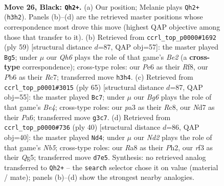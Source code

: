 \documentclass[11pt]{article}
\begin{document}
\clearpage

\begin{figure}[p]\centering
\begin{subfigure}{0.46\textwidth}\centering
\resizebox{\linewidth}{!}{%
\newchessgame
\chessboard[
  setfen={r6r/3nk2p/1pp1p1p1/8/1p1P3P/P3PRbq/RP4N1/2BQ2K1 b - - 4 26},
  showmover=false,
  pgfstyle=straightmove, color=movearrow, markmove={h3-h2}
]}
\caption{}
\end{subfigure}\hfill
\begin{subfigure}{0.46\textwidth}\centering
\resizebox{\linewidth}{!}{%
\newchessgame
\chessboard[
  setfen={5rk1/2r1b1p1/1p1Np2p/p1n1P2q/8/PP3PB1/4Q2P/2R2R1K b - - 5 30},
  showmover=false,
  pgfstyle=straightmove, color=movearrow, markmove={e7-g5}
]}
\caption{}
\end{subfigure}
\\[4pt]
\begin{subfigure}{0.46\textwidth}\centering
\resizebox{\linewidth}{!}{%
\newchessgame
\chessboard[
  setfen={2r3k1/7p/pn4p1/4bq2/1P1pNP2/1P4QP/P1p3P1/2B1R1K1 b - - 0 33},
  showmover=false,
  pgfstyle=straightmove, color=movearrow, markmove={e5-c7}
]}
\caption{}
\end{subfigure}\hfill
\begin{subfigure}{0.46\textwidth}\centering
\resizebox{\linewidth}{!}{%
\newchessgame
\chessboard[
  setfen={3r2k1/pp4qp/2n1prp1/1N1p2Q1/4P3/1P6/P4PPP/3R1RK1 w - - 0 21},
  showmover=false,
  pgfstyle=straightmove, color=movearrow, markmove={b5-d4}
]}
\caption{}
\end{subfigure}
\caption{\textbf{Move 26, Black: \texttt{Qh2+}.} (a) Our position; Melanie plays \texttt{Qh2+} (\texttt{h3h2}). Panels (b)--(d) are the retrieved master positions whose correspondence most drove this move (highest QAP objective among those that transfer to it). (b) Retrieved from \texttt{ccrl\_top\_p0000\#1692} (ply 59) [structural distance $d$=87, QAP obj=57]: the master played \texttt{Bg5}; under $\mu$ our \emph{Qh6} plays the role of that game's \emph{Be2} (a \textbf{cross-type} correspondence); cross-type roles: our \emph{P}e6 as their \emph{R}f8, our \emph{P}b6 as their \emph{R}c7; transferred move \texttt{h3h4}. (c) Retrieved from \texttt{ccrl\_top\_p0001\#3015} (ply 65) [structural distance $d$=87, QAP obj=55]: the master played \texttt{Bc7}; under $\mu$ our \emph{Bg6} plays the role of that game's \emph{Be4}; cross-type roles: our \emph{p}a3 as their \emph{R}c8, our \emph{N}d7 as their \emph{P}a6; transferred move \texttt{g3c7}. (d) Retrieved from \texttt{ccrl\_top\_p0000\#736} (ply 40) [structural distance $d$=86, QAP obj=40]: the master played \texttt{Nd4}; under $\mu$ our \emph{Nd2} plays the role of that game's \emph{Nb5}; cross-type roles: our \emph{R}a8 as their \emph{P}h2, our \emph{r}f3 as their \emph{Q}g5; transferred move \texttt{d7e5}. Synthesis: no retrieved analog transferred to \texttt{Qh2+} -- the \texttt{search} selector chose it on value (material / mate); panels (b)--(d) show the strongest nearby analogies.}
\label{fig:thought-m51}
\end{figure}
\end{document}
